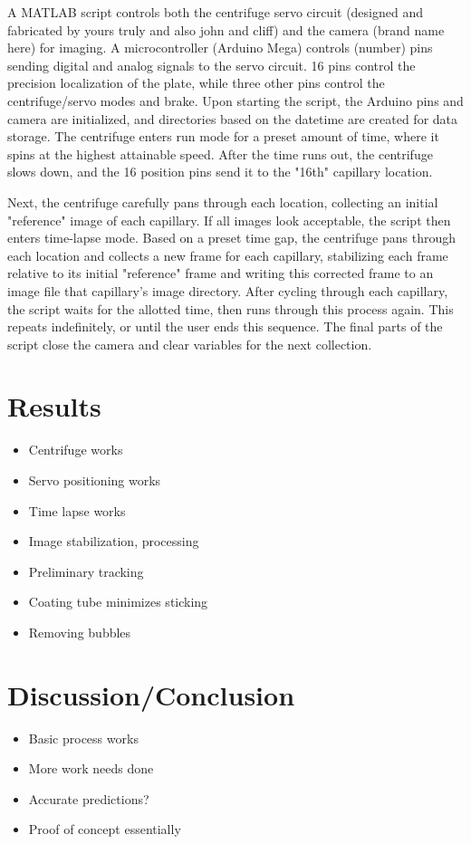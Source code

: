 A MATLAB script controls both the centrifuge servo circuit (designed and fabricated by yours truly and also john and cliff) and the camera (brand name here) for imaging. A microcontroller (Arduino Mega) controls (number) pins sending digital and analog signals to the servo circuit. 16 pins control the precision localization of the plate, while three other pins control the centrifuge/servo modes and brake. Upon starting the script, the Arduino pins and camera are initialized, and directories based on the datetime are created for data storage. The centrifuge enters run mode for a preset amount of time, where it spins at the highest attainable speed. After the time runs out, the centrifuge slows down, and the 16 position pins send it to the "16th" capillary location.

Next, the centrifuge carefully pans through each location, collecting an initial "reference" image of each capillary. If all images look acceptable, the script then enters time-lapse mode. Based on a preset time gap, the centrifuge pans through each location and collects a new frame for each capillary, stabilizing each frame relative to its initial "reference" frame and writing this corrected frame to an image file that capillary's image directory. After cycling through each capillary, the script waits for the allotted time, then runs through this process again. This repeats indefinitely, or until the user ends this sequence. The final parts of the script close the camera and clear variables for the next collection.

 
\section{Results}
\begin{itemize}
    \item Centrifuge works
    \item Servo positioning works
    \item Time lapse works
    \item Image stabilization, processing
    \item Preliminary tracking
    \item Coating tube minimizes sticking
    \item Removing bubbles
\end{itemize}

\section{Discussion/Conclusion}
\begin{itemize}
    \item Basic process works
    \item More work needs done
    \item Accurate predictions?
    \item Proof of concept essentially
\end{itemize}



%
%


